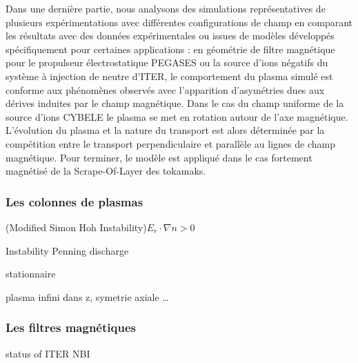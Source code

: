 \begin{refsection}
		Dans une dernière partie, nous analysons des simulations représentatives de
		plusieurs expérimentations avec différentes configurations de champ en comparant
		les résultats avec des données expérimentales ou issues de modèles développés
		spécifiquement pour certaines applications :
		en géométrie de filtre magnétique pour le propulseur électrostatique PEGASES
		ou la source d'ions négatifs du système à injection de neutre d'ITER, le
		comportement du plasma simulé est conforme aux phénomènes observés avec
		l’apparition d’asymétries dues aux dérives induites par le champ magnétique.
		Dans le cas du champ uniforme de la source d'ions CYBELE le plasma se met en
		rotation autour de l'axe magnétique. L'évolution du plasma et la nature du
		transport est alors déterminée par la compétition entre le transport
		perpendiculaire et parallèle au lignes de champ magnétique. Pour terminer, le
		modèle est appliqué dans le cas fortement magnétisé de la Scrape-Of-Layer des
		tokamaks.
		
\subsubsection{Les colonnes de plasmas}
\parencite{RosenbluthSimon}

\parencite{Sakawa} (Modified Simon Hoh Instability)$E_r\cdot\nabla n > 0$

\parencite{Hoh} Instability Penning discharge

\parencite{Fruchtman} stationnaire

\parencite{Sternberg} plasma infini dans z, symetrie axiale \ldots 

\subsubsection{Les filtres magnétiques}
\parencite{Hemsworth} status of ITER NBI

\parencite{Rosenbluth}\parencite{Chandrasekhar}
%
%
\end{refsection}

